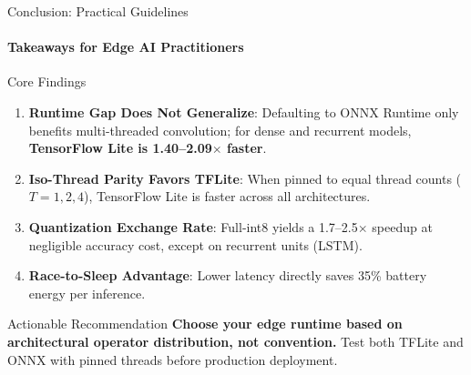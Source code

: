 \documentclass[aspectratio=169]{beamer}
\begin{document}
\begin{frame}{Conclusion: Practical Guidelines}
\framesubtitle{Takeaways for Edge AI Practitioners}
\begin{block}{Core Findings}
  \begin{enumerate}\small
    \item \textbf{Runtime Gap Does Not Generalize}: Defaulting to ONNX Runtime only benefits multi-threaded convolution; for dense and recurrent models, \textbf{TensorFlow Lite is 1.40--2.09$\times$ faster}.
    \item \textbf{Iso-Thread Parity Favors TFLite}: When pinned to equal thread counts ($T=1, 2, 4$), TensorFlow Lite is faster across all architectures.
    \item \textbf{Quantization Exchange Rate}: Full-int8 yields a 1.7--2.5$\times$ speedup at negligible accuracy cost, except on recurrent units (LSTM).
    \item \textbf{Race-to-Sleep Advantage}: Lower latency directly saves 35\% battery energy per inference.
  \end{enumerate}
\end{block}

\begin{alertblock}{Actionable Recommendation}
  \small \textbf{Choose your edge runtime based on architectural operator distribution, not convention.} Test both TFLite and ONNX with pinned threads before production deployment.
\end{alertblock}
\end{frame}
\end{document}

